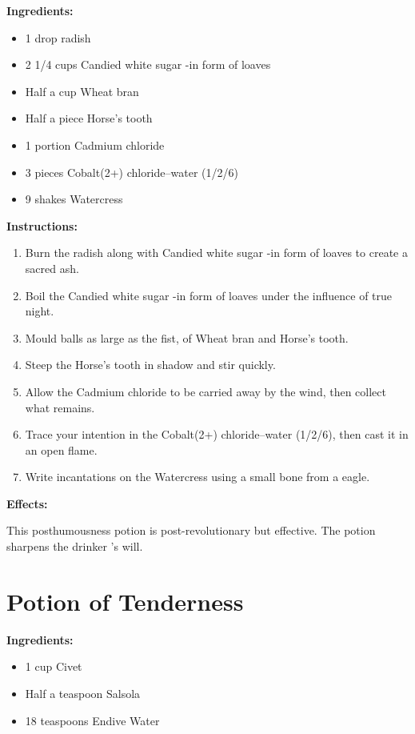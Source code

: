 \documentclass{article}
\begin{document}
\textbf{Ingredients:}

\begin{itemize}
  \item 1 drop radish
  \item 2 1/4 cups Candied white sugar -in form of loaves
  \item Half a cup Wheat bran
  \item Half a piece Horse's tooth
  \item 1 portion Cadmium chloride
  \item 3 pieces Cobalt(2+) chloride--water (1/2/6)
  \item 9 shakes Watercress
\end{itemize}

\textbf{Instructions:}

\begin{enumerate}
  \item Burn the radish along with Candied white sugar -in form of loaves to create a sacred ash.
  \item Boil the Candied white sugar -in form of loaves under the influence of true night.
  \item Mould balls as large as the fist, of Wheat bran and Horse's tooth.
  \item Steep the Horse's tooth in shadow and stir quickly.
  \item Allow the Cadmium chloride to be carried away by the wind, then collect what remains.
  \item Trace your intention in the Cobalt(2+) chloride--water (1/2/6), then cast it in an open flame.
  \item Write incantations on the Watercress using a small bone from a eagle.
\end{enumerate}

\textbf{Effects:}

This posthumousness potion is post-revolutionary but effective. The potion sharpens the drinker 's will.

\newpage
\section*{Potion of Tenderness}

\textbf{Ingredients:}

\begin{itemize}
  \item 1 cup Civet
  \item Half a teaspoon Salsola
  \item 18 teaspoons Endive Water
\end{itemize}
\end{document}

